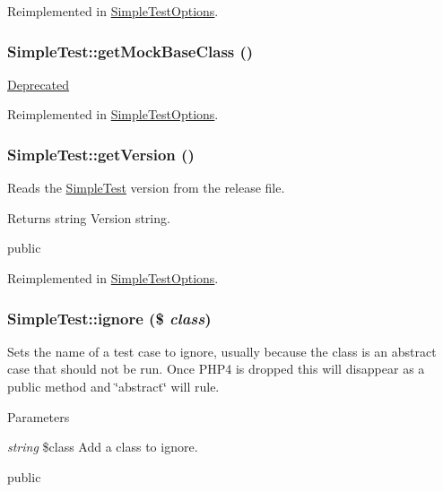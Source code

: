 Reimplemented in \hyperlink{class_simple_test_options_a5f3b3d362318bcc9fb3da67c25229dde}{SimpleTestOptions}.\hypertarget{class_simple_test_a570025ed110ef875fa426e67acfbd326}{
\subsubsection[{getMockBaseClass}]{\setlength{\rightskip}{0pt plus 5cm}SimpleTest::getMockBaseClass ()}}
\label{class_simple_test_a570025ed110ef875fa426e67acfbd326}
\begin{Desc}
\item[\hyperlink{deprecated__deprecated000007}{Deprecated}]\end{Desc}


Reimplemented in \hyperlink{class_simple_test_options_a9059697594290ad1e01e7cf5d2e6237c}{SimpleTestOptions}.\hypertarget{class_simple_test_a98340f36ae1706e734230de930e7a054}{
\subsubsection[{getVersion}]{\setlength{\rightskip}{0pt plus 5cm}SimpleTest::getVersion ()}}
\label{class_simple_test_a98340f36ae1706e734230de930e7a054}
Reads the \hyperlink{class_simple_test}{SimpleTest} version from the release file. \begin{DoxyReturn}{Returns}
string Version string.
\end{DoxyReturn}
public 

Reimplemented in \hyperlink{class_simple_test_options_a187d2d7c509d83c6b25e6dcc0e2f8a1e}{SimpleTestOptions}.\hypertarget{class_simple_test_ad50fcd3215d2e5166c41bc73cef1bbe6}{
\subsubsection[{ignore}]{\setlength{\rightskip}{0pt plus 5cm}SimpleTest::ignore (\$ {\em class})}}
\label{class_simple_test_ad50fcd3215d2e5166c41bc73cef1bbe6}
Sets the name of a test case to ignore, usually because the class is an abstract case that should not be run. Once PHP4 is dropped this will disappear as a public method and \char`\"{}abstract\char`\"{} will rule. 
\begin{DoxyParams}{Parameters}
\item[{\em string}]\$class Add a class to ignore.\end{DoxyParams}
public 

